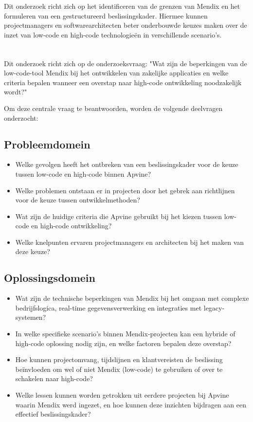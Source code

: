 Dit onderzoek richt zich op het identificeren van de grenzen van Mendix en het formuleren van een gestructureerd beslissingskader. Hiermee kunnen projectmanagers en softwarearchitecten beter onderbouwde keuzes maken over de inzet van low-code en high-code technologieën in verschillende scenario's.


\section{}%
\label{sec:onderzoeksvraag}

Dit onderzoek richt zich op de onderzoeksvraag: "Wat zijn de beperkingen van de low-code-tool Mendix bij het ontwikkelen van zakelijke applicaties en welke criteria bepalen wanneer een overstap naar high-code ontwikkeling noodzakelijk wordt?" 

Om deze centrale vraag te beantwoorden, worden de volgende deelvragen onderzocht:  

\subsection{Probleemdomein}
\begin{itemize}
    \item Welke gevolgen heeft het ontbreken van een beslissingskader voor de keuze tussen low-code en high-code binnen Apvine?
    \item Welke problemen ontstaan er in projecten door het gebrek aan richtlijnen voor de keuze tussen ontwikkelmethoden?
    \item Wat zijn de huidige criteria die Apvine gebruikt bij het kiezen tussen low-code en high-code ontwikkeling?
    \item Welke knelpunten ervaren projectmanagers en architecten bij het maken van deze keuze?
\end{itemize}

\subsection{Oplossingsdomein}
\begin{itemize}
    \item Wat zijn de technische beperkingen van Mendix bij het omgaan met complexe bedrijfslogica, real-time gegevensverwerking en integraties met legacy-systemen?
    \item In welke specifieke scenario’s binnen Mendix-projecten kan een hybride of high-code oplossing nodig zijn, en welke factoren bepalen deze overstap?
    \item Hoe kunnen projectomvang, tijdslijnen en klantvereisten de beslissing beïnvloeden om wel of niet Mendix (low-code) te gebruiken of over te schakelen naar high-code?
    \item Welke lessen kunnen worden getrokken uit eerdere projecten bij Apvine waarin Mendix werd ingezet, en hoe kunnen deze inzichten bijdragen aan een effectief beslissingskader?
\end{itemize}

